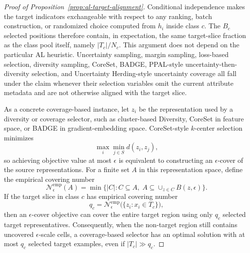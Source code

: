 \begin{tcolorbox}[
    colback=green!2!white,
    colframe=green!20!white,
    arc=3pt,
    boxrule=1pt,
    drop shadow,
    breakable
]
\begin{proof}[Proof of Proposition~\ref{prop:al-target-alignment}]
Conditional independence makes the target indicators exchangeable with respect to any ranking, batch construction, or randomized choice computed from $h_i$ inside class $c$. The $B_c$ selected positions therefore contain, in expectation, the same target-slice fraction as the class pool itself, namely $|T_c|/N_c$. This argument does not depend on the particular AL heuristic. Uncertainty sampling, margin sampling, loss-based selection, diversity sampling, CoreSet, BADGE, PPAL-style uncertainty-then-diversity selection, and Uncertainty Herding-style uncertainty coverage all fall under the claim whenever their selection variables omit the current attribute metadata and are not otherwise aligned with the target slice.

As a concrete coverage-based instance, let $z_i$ be the representation used by a diversity or coverage selector, such as cluster-based Diversity, CoreSet in feature space, or BADGE in gradient-embedding space. CoreSet-style $k$-center selection minimizes
\begin{equation}
\label{eq:k-center-objective}
\max_i \min_{j\in S} d(z_i,z_j),
\end{equation}
so achieving objective value at most $\epsilon$ is equivalent to constructing an $\epsilon$-cover of the source representations. For a finite set $A$ in this representation space, define the empirical covering number
\begin{equation}
\label{eq:empirical-covering-number}
\mathcal{N}^{\mathrm{emp}}_{\epsilon}(A)
=
\min\big\{|C|: C\subseteq A,\; A\subseteq \cup_{z\in C}B(z,\epsilon)\big\}.
\end{equation}
If the target slice in class $c$ has empirical covering number
\begin{equation}
\label{eq:target-covering-number}
q_c=\mathcal{N}^{\mathrm{emp}}_{\epsilon}\big(\{z_i:x_i\in T_c\}\big),
\end{equation}
then an $\epsilon$-cover objective can cover the entire target region using only $q_c$ selected target representatives. Consequently, when the non-target region still contains uncovered $\epsilon$-scale cells, a coverage-based selector has an optimal solution with at most $q_c$ selected target examples, even if $|T_c|\gg q_c$.


\end{proof}
\end{tcolorbox}
